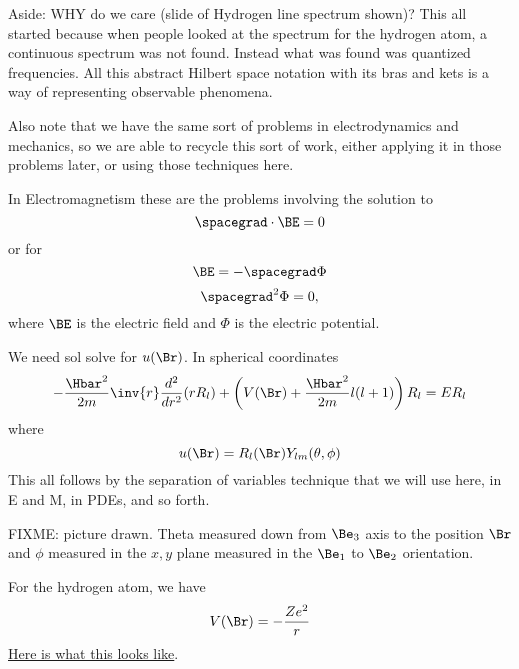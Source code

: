 Aside: WHY do we care (slide of Hydrogen line spectrum shown)?  This all started because when people looked at the spectrum for the hydrogen atom, a continuous spectrum was not found.  Instead what was found was quantized frequencies.  All this abstract Hilbert space notation with its bras and kets is a way of representing observable phenomena.

Also note that we have the same sort of problems in electrodynamics and mechanics, so we are able to recycle this sort of work, either applying it in those problems later, or using those techniques here.

In Electromagnetism these are the problems involving the solution to
%
\begin{equation}\label{eqn:PHY356FLecture10:30}
\spacegrad \cdot \BE = 0
\end{equation}
%
or for
\begin{equation}\label{eqn:PHY356FLecture10:40}
\BE = - \spacegrad \Phi
\end{equation}
%
%
\begin{equation}\label{eqn:PHY356FLecture10:60}
\spacegrad^2 \Phi = 0,
\end{equation}
%
where \(\BE\) is the electric field and \(\Phi\) is the electric potential.


We need sol solve  for \(u(\Br)\).  In spherical coordinates
%
\begin{equation}\label{eqn:PHY356FLecture10:70}
-\frac{\Hbar^2}{2m} \inv{r} \frac{d^2}{dr^2} ( r R_l ) + \left( V(\Br) + \frac{\Hbar^2 }{2m} l(l+1) \right) R_l = E R_l
\end{equation}
%
where
\begin{equation}\label{eqn:PHY356FLecture10:80}
u(\Br) = R_l(\Br) Y_{lm}(\theta, \phi)
\end{equation}
%
This all follows by the separation of variables technique that we will use here, in E and M, in PDEs, and so forth.

FIXME: picture drawn.  Theta measured down from \(\Be_3\) axis to the position \(\Br\) and \(\phi\) measured in the \(x,y\) plane measured in the \(\Be_1\) to \(\Be_2\) orientation.

For the hydrogen atom, we have
%
\begin{equation}\label{eqn:PHY356FLecture10:90}
V(\Br) = - \frac{Z e^2}{r}
\end{equation}
%
\href{http://www.wolframalpha.com/input/?i=graph+-1/r}{Here is what this looks like}.

